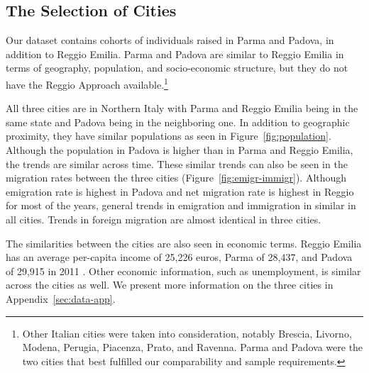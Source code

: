 \subsection{The Selection of Cities}

Our dataset contains cohorts of individuals raised in Parma and Padova, in addition to Reggio Emilia. Parma and Padova are similar to Reggio Emilia in terms of geography, population, and socio-economic structure, but they do not have the Reggio Approach available.\footnote{Other Italian cities were taken into consideration, notably Brescia, Livorno, Modena, Perugia, Piacenza, Prato, and Ravenna. Parma and Padova were the two cities that best fulfilled our comparability and sample requirements.} 

All three cities are in Northern Italy with Parma and Reggio Emilia being in the same state and Padova being in the neighboring one. In addition to geographic proximity, they have similar populations as seen in Figure~\ref{fig:population}. Although the population in Padova is higher than in Parma and Reggio Emilia, the trends are similar across time. These similar trends can also be seen in the migration rates between the three cities (Figure~\ref{fig:emigr-immigr}). Although emigration rate is highest in Padova and net migration rate is highest in Reggio for most of the years, general trends in emigration and immigration in similar in all cities. Trends in foreign migration are almost identical in three cities. 

The similarities between the cities are also seen in economic terms. Reggio Emilia has an average per-capita income of 25,226 euros, Parma of 28,437, and Padova of 29,915 in 2011 \citep{Comuni-Italiani_2017_Redditi-Ipref-per-Regione-2011}. Other economic information, such as unemployment, is similar across the cities as well. We present more information on the three cities in Appendix~\ref{sec:data-app}. 

